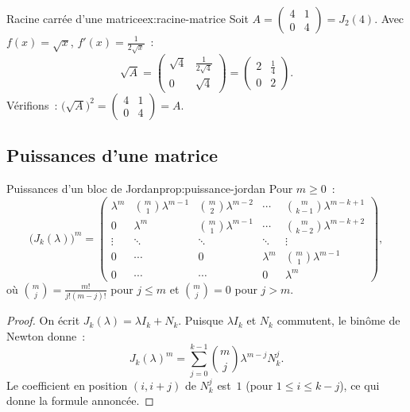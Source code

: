 \begin{example}{Racine carrée d'une matrice}{ex:racine-matrice}
  Soit $A=\begin{pmatrix}4&1\\0&4\end{pmatrix}=J_2(4)$. Avec
  $f(x)=\sqrt{x}$, $f'(x)=\frac{1}{2\sqrt{x}}$~:
  \[
    \sqrt{A}=\begin{pmatrix}\sqrt{4}&\frac{1}{2\sqrt{4}}\\0&\sqrt{4}\end{pmatrix}
    =\begin{pmatrix}2&\frac{1}{4}\\0&2\end{pmatrix}.
  \]
  Vérifions~: $\bigl(\sqrt{A}\bigr)^2=
  \begin{pmatrix}4&1\\0&4\end{pmatrix}=A$.
\end{example}


\subsection{Puissances d'une matrice}\label{subsec:puissances}

\begin{proposition}{Puissances d'un bloc de Jordan}{prop:puissance-jordan}
  Pour $m\geq 0$~:
  \[
    \bigl(J_k(\lambda)\bigr)^m=\begin{pmatrix}
      \lambda^m & \binom{m}{1}\lambda^{m-1} & \binom{m}{2}\lambda^{m-2}
        & \cdots & \binom{m}{k-1}\lambda^{m-k+1} \\
      0 & \lambda^m & \binom{m}{1}\lambda^{m-1} & \cdots
        & \binom{m}{k-2}\lambda^{m-k+2} \\
      \vdots & \ddots & \ddots & \ddots & \vdots \\
      0 & \cdots & 0 & \lambda^m & \binom{m}{1}\lambda^{m-1} \\
      0 & \cdots & \cdots & 0 & \lambda^m
    \end{pmatrix},
  \]
  où $\binom{m}{j}=\frac{m!}{j!(m-j)!}$ pour $j\leq m$ et
  $\binom{m}{j}=0$ pour $j>m$.
\end{proposition}

\begin{proof}
  On écrit $J_k(\lambda)=\lambda I_k+N_k$. Puisque $\lambda I_k$ et
  $N_k$ commutent, le binôme de Newton donne~:
  \[
    J_k(\lambda)^m=\sum_{j=0}^{k-1}\binom{m}{j}\lambda^{m-j}N_k^j.
  \]
  Le coefficient en position $(i,i+j)$ de $N_k^j$ est~$1$ (pour
  $1\leq i\leq k-j$), ce qui donne la formule annoncée.
\end{proof}


